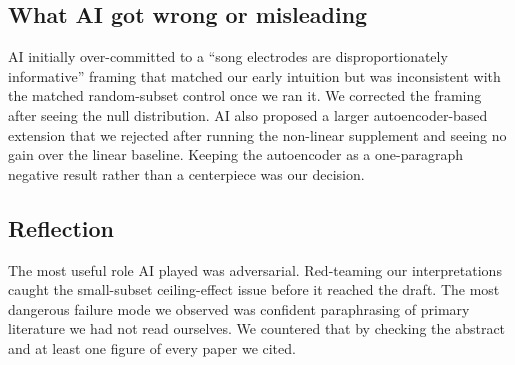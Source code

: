 \documentclass[11pt]{article}
\begin{document}
\subsection*{What AI got wrong or misleading}
AI initially over-committed to a ``song electrodes are disproportionately informative'' framing that matched our early intuition but was inconsistent with the matched random-subset control once we ran it. We corrected the framing after seeing the null distribution. AI also proposed a larger autoencoder-based extension that we rejected after running the non-linear supplement and seeing no gain over the linear baseline. Keeping the autoencoder as a one-paragraph negative result rather than a centerpiece was our decision.

\subsection*{Reflection}
The most useful role AI played was adversarial. Red-teaming our interpretations caught the small-subset ceiling-effect issue before it reached the draft. The most dangerous failure mode we observed was confident paraphrasing of primary literature we had not read ourselves. We countered that by checking the abstract and at least one figure of every paper we cited.
\end{document}
